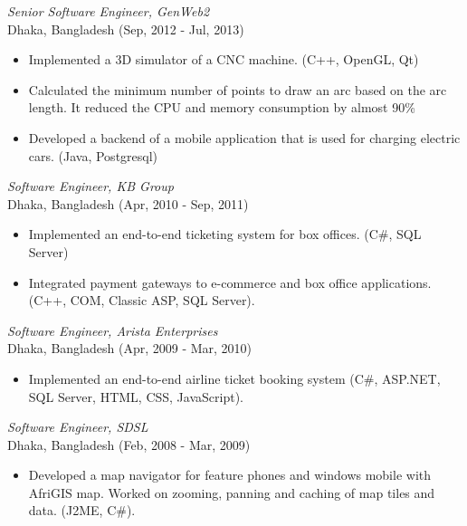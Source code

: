 \documentclass{res}
\begin{document}
\begin{resume}
{\sl Senior Software Engineer, GenWeb2} \\
Dhaka, Bangladesh (Sep, 2012 - Jul, 2013)
\begin{itemize} \itemsep -2pt
	\item  Implemented a 3D simulator of a CNC machine. (C++, OpenGL, Qt)
	\item  Calculated the minimum number of points to draw an arc based on the arc length. It reduced the CPU and memory consumption by almost 90\%
	\item Developed a backend of a mobile application that is used for charging electric cars. (Java, Postgresql) 
\end{itemize} \vspace{-6pt}
 
{\sl Software Engineer, KB Group} \\
Dhaka, Bangladesh (Apr, 2010 - Sep, 2011)
 \begin{itemize}
 \item  Implemented an end-to-end ticketing system for box offices. (C\#, SQL Server)
  \item  Integrated payment gateways to e-commerce and box office applications. (C++, COM, Classic ASP, SQL Server).
 \end{itemize} 
 
{\sl Software Engineer, Arista Enterprises}  \\
Dhaka, Bangladesh (Apr, 2009 - Mar, 2010)
\begin{itemize} 
\item  Implemented an end-to-end airline ticket booking system (C\#, ASP.NET, SQL Server, HTML, CSS, JavaScript). 
\end{itemize}  

{\sl Software Engineer, SDSL}  \\
Dhaka, Bangladesh (Feb, 2008 - Mar, 2009)
\begin{itemize}
\item Developed a map navigator for feature phones and windows mobile with AfriGIS map. Worked on zooming, panning and caching of map tiles and data. (J2ME, C\#).
\end{itemize} 
 
\vspace{0.01in} 

\end{resume}
\end{document}
